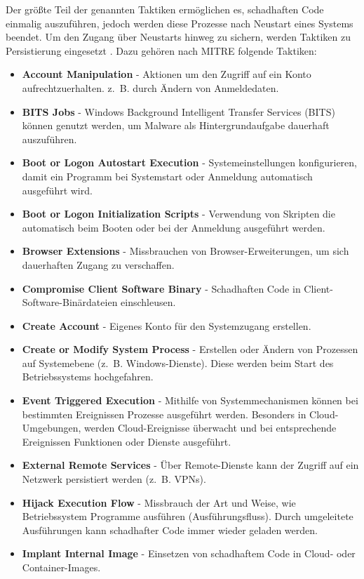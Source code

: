 \documentclass[conference]{IEEEtran}
\begin{document}
Der größte Teil der genannten Taktiken ermöglichen es, schadhaften Code einmalig auszuführen, jedoch werden diese Prozesse nach Neustart eines Systems beendet.
Um den Zugang über Neustarts hinweg zu sichern, werden Taktiken zu Persistierung eingesetzt \cite{MITREPersistence}.
Dazu gehören nach MITRE \cite{MITREPersistence} folgende Taktiken:
\begin{itemize}
    \item \textbf{Account Manipulation} - Aktionen um den Zugriff auf ein Konto aufrechtzuerhalten. z.~B. durch Ändern von Anmeldedaten.
    \item \textbf{BITS Jobs} - Windows Background Intelligent Transfer Services (BITS) können genutzt werden, um Malware als Hintergrundaufgabe dauerhaft auszuführen.
    \item \textbf{Boot or Logon Autostart Execution} - Systemeinstellungen konfigurieren, damit ein Programm bei Systemstart oder Anmeldung automatisch ausgeführt wird.
    \item \textbf{Boot or Logon Initialization Scripts} - Verwendung von Skripten die automatisch beim Booten oder bei der Anmeldung ausgeführt werden.
    \item \textbf{Browser Extensions} - Missbrauchen von Browser-Erweiterungen, um sich dauerhaften Zugang zu verschaffen.
    \item \textbf{Compromise Client Software Binary} - Schadhaften Code in Client-Software-Binärdateien einschleusen.
    \item \textbf{Create Account} - Eigenes Konto für den Systemzugang erstellen.
    \item \textbf{Create or Modify System Process} - Erstellen oder Ändern von Prozessen auf Systemebene (z.~B. Windows-Dienste). Diese werden beim Start des Betriebssystems hochgefahren.
    \item \textbf{Event Triggered Execution} - Mithilfe von Systemmechanismen können bei bestimmten Ereignissen Prozesse ausgeführt werden. Besonders in Cloud-Umgebungen, werden Cloud-Ereignisse überwacht und bei entsprechende Ereignissen Funktionen oder Dienste ausgeführt.
    \item \textbf{External Remote Services} - Über Remote-Dienste kann der Zugriff auf ein Netzwerk persistiert werden (z.~B. VPNs).
    \item \textbf{Hijack Execution Flow} - Missbrauch der Art und Weise, wie Betriebssystem Programme ausführen (Ausführungsfluss). Durch umgeleitete Ausführungen kann schadhafter Code immer wieder geladen werden.
    \item \textbf{Implant Internal Image} - Einsetzen von schadhaftem Code in Cloud- oder Container-Images.

\end{itemize}
\end{document}
